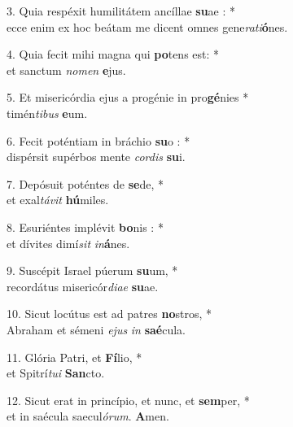 3. Quia resp\'{e}xit humilit\'{a}tem anc\'{i}llae \textbf{su}ae : *\\
ecce enim ex hoc be\'{a}tam me dicent omnes gene\emph{rati}\textbf{\'{o}}nes.

4. Quia fecit mihi magna qui \textbf{po}tens est: *\\
et sanctum \emph{nomen} \textbf{e}jus.

5. Et miseric\'{o}rdia ejus a prog\'{e}nie in pro\textbf{g\'{e}}nies *\\
tim\'{e}n\emph{tibus} \textbf{e}um.

6. Fecit pot\'{e}ntiam in br\'{a}chio \textbf{su}o : *\\
disp\'{e}rsit sup\'{e}rbos mente \emph{cordis} \textbf{su}i.

7. Dep\'{o}suit pot\'{e}ntes de \textbf{se}de, * \\
et exal\emph{t\'{a}vit} \textbf{h\'{u}}miles.

8. Esuri\'{e}ntes impl\'{e}vit \textbf{bo}nis : *\\
et d\'{i}vites dim\'{i}\emph{sit} \emph{in}\textbf{\'{a}}nes.

9. Susc\'{e}pit Israel p\'{u}erum \textbf{su}um, *\\
record\'{a}tus miseric\'or\emph{diae} \textbf{su}ae.

10. Sicut loc\'utus est ad patres \textbf{no}stros, *\\
Abraham et s\'emeni \emph{ejus} \emph{in} \textbf{sa\'e}cula.

11. Gl\'oria Patri, et \textbf{F\'i}lio, *\\
et Spitr\'i\emph{tui} \textbf{San}cto.

12. Sicut erat in princ\'ipio, et nunc, et \textbf{sem}per, *\\
et in sa\'ecula saecul\emph{\'orum}. \textbf{A}men.
